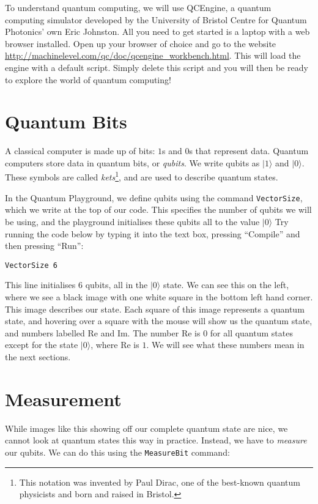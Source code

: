 \documentclass[twocolumn]{article}
\begin{document}
To understand quantum computing, we will use QCEngine, a quantum computing simulator developed by the University of Bristol Centre for Quantum Photonics' own Eric Johnston. All you need to get started is a laptop with a web browser installed. Open up your browser of choice and go to the website \url{http://machinelevel.com/qc/doc/qcengine_workbench.html}. This will load the engine with a default script. Simply delete this script and you will then be ready to explore the world of quantum computing!

\section{Quantum Bits}

A classical computer is made up of bits: $1$s and $0$s that represent data. Quantum computers store data in quantum bits, or {\em qubits}. We write qubits as $|1\rangle$ and $|0\rangle$. These symbols are called {\em kets}\footnote{This notation was invented by Paul Dirac, one of the best-known quantum physicists and born and raised in Bristol.}, and are used to describe quantum states.

In the Quantum Playground, we define qubits using the command \texttt{VectorSize}, which we write at the top of our code. This specifies the number of qubits we will be using, and the playground initialises these qubits all to the value $|0\rangle$ Try running the code below by typing it into the text box, pressing ``Compile'' and then pressing ``Run'':

\begin{lstlisting}
VectorSize 6
\end{lstlisting}

This line initialises $6$ qubits, all in the $|0\rangle$ state. We can see this on the left, where we see a black image with one white square in the bottom left hand corner. This image describes our state. Each square of this image represents a quantum state, and hovering over a square with the mouse will show us the quantum state, and numbers labelled Re and Im. The number Re is $0$ for all quantum states except for the state $|0\rangle$, where Re is $1$. We will see what these numbers mean in the next sections.

\section{Measurement}

While images like this showing off our complete quantum state are nice, we cannot look at quantum states this way in practice. Instead, we have to {\em measure} our qubits. We can do this using the \texttt{MeasureBit} command:
\end{document}
